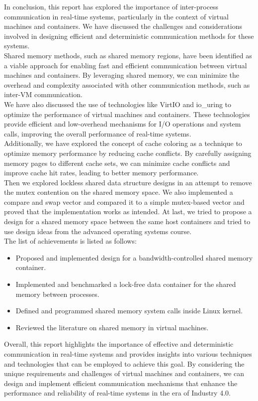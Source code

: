 \documentclass[a4paper, 11pt, twocolumn]{article}
\theoremstyle{nonumberplain}
\begin{document}
In conclusion, this report has explored the importance of inter-process
communication in real-time systems, particularly in the context of virtual
machines and containers. We have discussed the challenges and considerations
involved in designing efficient and deterministic communication methods for
these systems. \\
Shared memory methods, such as shared memory regions, have been identified
as a viable approach for enabling fast and efficient communication between
virtual machines and containers. By leveraging shared memory, we can minimize
the overhead and complexity associated with other communication methods,
such as inter-VM communication. \\
We have also discussed the use of technologies like VirtIO and io\_uring to
optimize the performance of virtual machines and containers.
These technologies provide efficient and low-overhead mechanisms
for I/O operations and system calls, improving the
overall performance of real-time systems. \\
Additionally, we have explored the concept of cache coloring as a technique
to optimize memory performance by reducing cache conflicts.
By carefully assigning memory pages to different cache sets,
we can minimize cache conflicts and improve cache hit rates,
leading to better memory performance. \\
Then we explored lockless shared data structure designs in an attempt to
remove the mutex contention on the shared memory space. We also implemented
a compare and swap vector and compared it to a simple mutex-based vector and
proved that the implementation works as intended.
At last, we tried to propose a design for a shared memory space between the same
host containers and tried to use design ideas from the advanced operating
systems course. \\
The list of achievements is listed as follows:
\begin{itemize}
    \item Proposed and implemented design for a bandwidth-controlled shared
        memory container.
    \item Implemented and benchmarked a lock-free data container for the shared
        memory between processes.
    \item Defined and programmed shared memory system calls inside Linux kernel.
    \item Reviewed the literature on shared memory in virtual machines.
\end{itemize}
Overall, this report highlights the importance of effective and
deterministic communication in real-time systems and provides insights
into various techniques and technologies that can be employed to achieve
this goal. By considering the unique requirements and challenges of
virtual machines and containers, we can design and implement efficient
communication mechanisms that enhance the performance and reliability of
real-time systems in the era of Industry 4.0.
\end{document}
